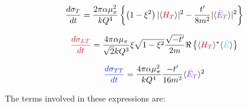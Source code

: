             \begin{equation}\label{eq:sigmaT}
                \textcolor{sigmaT}{\frac{d\sigma_{T}}{dt}} = 
                \frac{2\pi\alpha \mu_{\pi}^2}{kQ^4}
                \left\{ \left( 1 - \xi^2 \right) 
                \lvert \langle \GPDHTEQ \rangle \rvert ^2
                - \frac{t'}{8m^2}
                \lvert \langle \GPDETbarEQ \rangle \rvert ^2  \right\}    
            \end{equation} 
            
            \begin{equation}\label{eq:sigmaLT}
                \textcolor{sigmaLT}{\frac{d\sigma_{LT}}{dt}} = 
                \frac{4\pi\alpha \mu_{\pi}}{\sqrt{2}kQ^3}
                \xi\sqrt{1-\xi^2}
                \frac{\sqrt{-t'}}{2m}
                \Re \left\{ 
                 \langle \GPDHTEQ \rangle ^*
                \langle \GPDEtildeEQ \rangle   
                \right\}
             \end{equation} 
            
            
            \begin{equation}\label{eq:sigmaTT}
                \textcolor{sigmaTT}{\frac{d\sigma_{TT}}{dt}} = 
                \frac{4\pi\alpha \mu_{\pi}^2}{kQ^4}
                \frac{-t'}{16m^2}
                \langle \GPDETbarEQ \rangle^2   
            \end{equation} 
        
        
    
            The terms involved in these expressions are:
           

